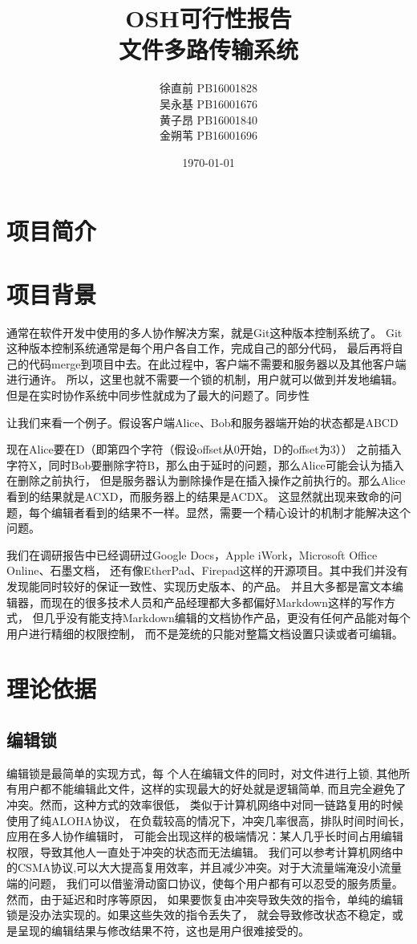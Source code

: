 \documentclass[11pt]{article}
\title{OSH可行性报告\\[2ex]文件多路传输系统}
\author{徐直前 PB16001828\\吴永基 PB16001676\\黄子昂 PB16001840\\金朔苇 PB16001696\\}
\date{\today}
\begin{document}
\maketitle
\tableofcontents

\section{项目简介}
\section{项目背景}
通常在软件开发中使用的多人协作解决方案，就是Git这种版本控制系统了。
Git这种版本控制系统通常是每个用户各自工作，完成自己的部分代码，
最后再将自己的代码merge到项目中去。在此过程中，客户端不需要和服务器以及其他客户端进行通许。
所以，这里也就不需要一个锁的机制，用户就可以做到并发地编辑。
但是在实时协作系统中同步性就成为了最大的问题了。同步性

让我们来看一个例子。假设客户端Alice、Bob和服务器端开始的状态都是ABCD

现在Alice要在D（即第四个字符（假设offset从0开始，D的offset为3））
之前插入字符X，同时Bob要删除字符B，那么由于延时的问题，那么Alice可能会认为插入在删除之前执行，
但是服务器认为删除操作是在插入操作之前执行的。那么Alice看到的结果就是ACXD，而服务器上的结果是ACDX。
这显然就出现来致命的问题，每个编辑者看到的结果不一样。显然，需要一个精心设计的机制才能解决这个问题。

我们在调研报告中已经调研过Google Docs，Apple iWork，Microsoft Office Online、石墨文档，
还有像EtherPad、Firepad这样的开源项目。其中我们并没有发现能同时较好的保证一致性、实现历史版本、的产品。
并且大多都是富文本编辑器，而现在的很多技术人员和产品经理都大多都偏好Markdown这样的写作方式，
但几乎没有能支持Markdown编辑的文档协作产品，更没有任何产品能对每个用户进行精细的权限控制，
而不是笼统的只能对整篇文档设置只读或者可编辑。


\section{理论依据}
\subsection{编辑锁}
编辑锁是最简单的实现方式，每
个人在编辑文件的同时，对文件进行上锁,
其他所有用户都不能编辑此文件，这样的实现最大的好处就是逻辑简单,
而且完全避免了冲突。然而，这种方式的效率很低，
类似于计算机网络中对同一链路复用的时候使用了纯ALOHA协议，
在负载较高的情况下，冲突几率很高，排队时间时间长，应用在多人协作编辑时，
可能会出现这样的极端情况：某人几乎长时间占用编辑权限，导致其他人一直处于冲突的状态而无法编辑。
我们可以参考计算机网络中的CSMA协议,可以大大提高复用效率，并且减少冲突。对于大流量端淹没小流量端的问题，
我们可以借鉴滑动窗口协议，使每个用户都有可以忍受的服务质量。然而，由于延迟和时序等原因，
如果要恢复由冲突导致失效的指令，单纯的编辑锁是没办法实现的。如果这些失效的指令丢失了，
就会导致修改状态不稳定，或是呈现的编辑结果与修改结果不符，这也是用户很难接受的。
\end{document}
